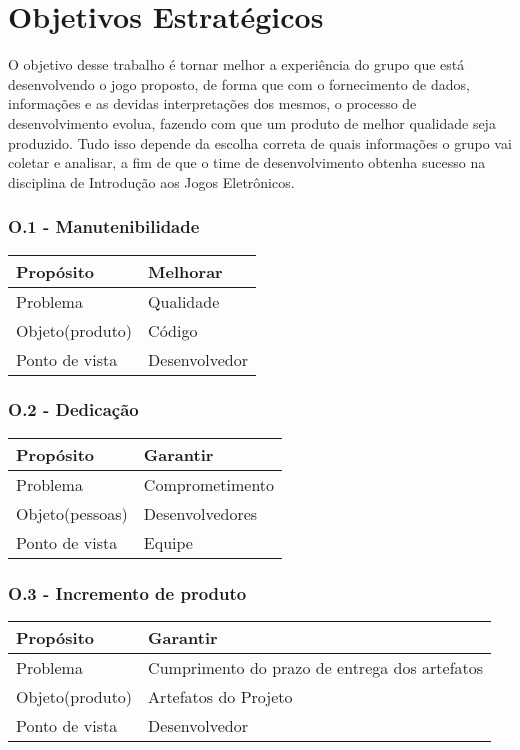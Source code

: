 \chapter{Objetivos Estratégicos}
	O objetivo desse trabalho é tornar melhor a experiência do grupo que está desenvolvendo o jogo proposto, de forma que com o fornecimento de dados, informações e as devidas interpretações dos mesmos, o processo de desenvolvimento evolua, fazendo com que um produto de melhor qualidade seja produzido. Tudo isso depende da escolha correta de quais informações o grupo vai coletar e analisar, a fim de que o time de desenvolvimento obtenha sucesso na disciplina de Introdução aos Jogos Eletrônicos.

\subsection{O.1 - Manutenibilidade}

	\begin{tabular}{ |p{5cm}|p{5cm}|  }
	 \hline
	 Propósito 		& 		Melhorar \\
	 \hline
	 Problema 		& 		Qualidade \\
	 \hline
	 Objeto(produto) 		& 		Código \\
	 \hline
	 Ponto de vista 		& 		Desenvolvedor \\
	 \hline
	\end{tabular}

\subsection{O.2 - Dedicação}

	\begin{tabular}{ |p{5cm}|p{5cm}|  }
	 \hline
	 Propósito 		& 		Garantir \\
	 \hline
	 Problema 		& 		Comprometimento \\
	 \hline
	 Objeto(pessoas) 		& 		Desenvolvedores \\
	 \hline
	 Ponto de vista 		& 		Equipe \\
	 \hline	
	\end{tabular}


\subsection{O.3 - Incremento de produto}

	\begin{tabular}{ |p{5cm}|p{5cm}|  }
	 \hline
	 Propósito 		& 		Garantir \\
	 \hline
	 Problema 		& 		Cumprimento do prazo de entrega dos artefatos \\
	 \hline
	 Objeto(produto) 		& 		Artefatos do Projeto \\
	 \hline
	 Ponto de vista 		& 		Desenvolvedor \\
	 \hline	
	\end{tabular}



